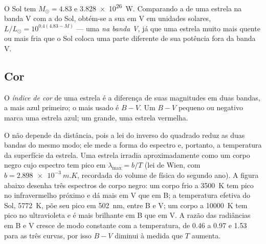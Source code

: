 O Sol tem  $M_\odot = 4.83$ e  \qty{3.828e26}{W}. Comparando a  de uma estrela na banda V com a do Sol, obtém-se a sua  em V em unidades solares,
$L/L_\odot = 10^{0.4(4.83 - M)}$ --- uma \emph{ na banda V}, já que uma estrela muito mais quente ou mais fria que o Sol coloca uma parte diferente de sua potência fora da banda V.

\subsection*{Cor}

\begin{definition}\label{def:b1:observing-the-sky:colour-index}
O \emph{índice de cor} de uma estrela é a diferença de suas magnitudes em duas bandas, a mais azul primeiro; o mais usado é $B - V$. Um $B - V$ pequeno ou negativo marca uma estrela azul; um grande, uma estrela vermelha.
\end{definition}

O  não depende da distância, pois a lei do inverso do quadrado reduz as duas bandas do mesmo modo; ele mede a forma do espectro e, portanto, a temperatura da superfície da estrela. Uma estrela irradia aproximadamente como um corpo negro cujo espectro tem pico em $\lambda_\mathrm{max} = b/T$ (lei de Wien, com
$b = \qty{2.898e-3}{m.K}$, recordada do volume de física do segundo ano).
A figura abaixo desenha três espectros de corpo negro: um corpo frio a \qty{3500}{K} tem pico no infravermelho próximo e dá mais  em V que em B; a temperatura efetiva do Sol, \qty{5772}{K}, põe seu pico em \qty{502}{nm}, entre B e V; um corpo a \qty{10000}{K} tem pico no ultravioleta e é mais brilhante em B que em V. A razão das radiâncias em B e V cresce de modo constante com a temperatura, de \num{0.46} a \num{0.97} e \num{1.53} para as três curvas, por isso $B - V$ diminui à medida que $T$ aumenta.

